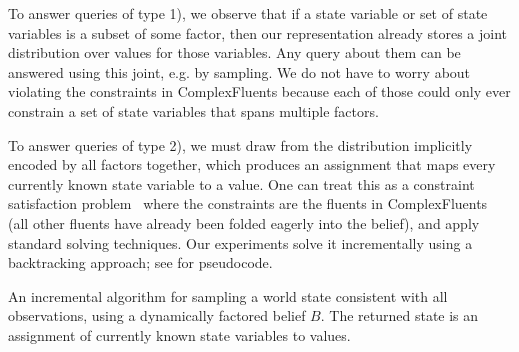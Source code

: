 To answer queries of type 1), we observe that if a state variable or set of state
variables is a subset of some factor, then our representation already
stores a joint distribution over values for those
variables. Any query about them can be answered
using this joint, e.g. by sampling. We do not have
to worry about violating the constraints in ComplexFluents because
each of those could only ever constrain a set of state variables that
spans multiple factors.

To answer queries of type 2), we must draw from the distribution implicitly encoded by
all factors together, which produces an assignment that maps every
currently known state variable to a value. One can
treat this as a constraint satisfaction problem~\cite{csp} where
the constraints are the fluents in ComplexFluents (all other fluents
have already been folded eagerly into the belief), and apply standard
solving techniques. Our experiments solve it incrementally using a backtracking
approach; see  for pseudocode.

\begin{algorithm}[t]
  \SetAlgoLined
  \SetAlgoNoEnd
  \DontPrintSemicolon
  \;
\caption{An incremental algorithm for sampling a world state
  consistent with all observations, using a dynamically factored
  belief $B$. The returned state is an assignment of currently known state
  variables to values.}
\label{alg:samplestate}
\end{algorithm}


